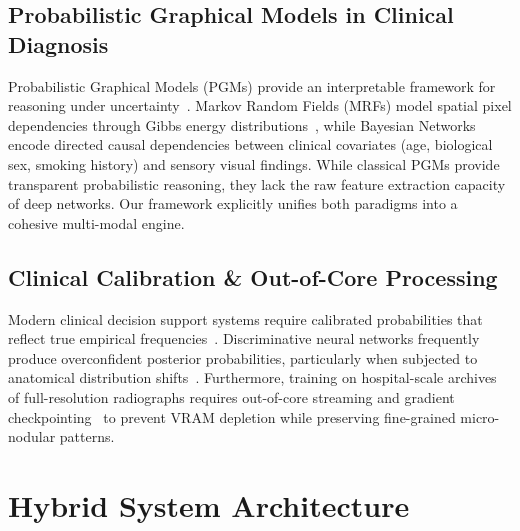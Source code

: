 \documentclass[conference]{IEEEtran}
\begin{document}
\subsection{Probabilistic Graphical Models in Clinical Diagnosis}
Probabilistic Graphical Models (PGMs) provide an interpretable framework for reasoning under uncertainty~\cite{koller2009probabilistic}. Markov Random Fields (MRFs) model spatial pixel dependencies through Gibbs energy distributions~\cite{geman1984stochastic}, while Bayesian Networks encode directed causal dependencies between clinical covariates (age, biological sex, smoking history) and sensory visual findings. While classical PGMs provide transparent probabilistic reasoning, they lack the raw feature extraction capacity of deep networks. Our framework explicitly unifies both paradigms into a cohesive multi-modal engine.

\subsection{Clinical Calibration \& Out-of-Core Processing}
Modern clinical decision support systems require calibrated probabilities that reflect true empirical frequencies~\cite{guo2017calibration}. Discriminative neural networks frequently produce overconfident posterior probabilities, particularly when subjected to anatomical distribution shifts~\cite{oakden2020hidden}. Furthermore, training on hospital-scale archives of full-resolution radiographs requires out-of-core streaming and gradient checkpointing~\cite{chen2016training} to prevent VRAM depletion while preserving fine-grained micro-nodular patterns.

\section{Hybrid System Architecture}
\end{document}

